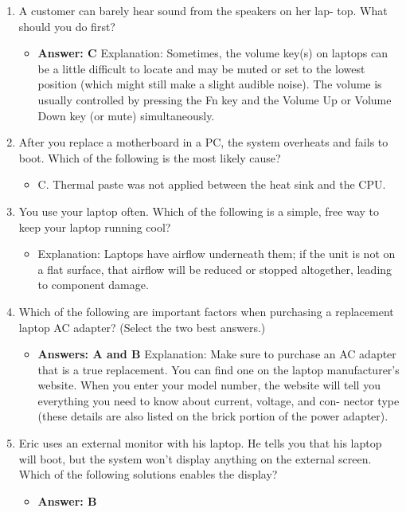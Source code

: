 \documentclass{article}
\begin{document}
\begin{enumerate}
    \item A customer can barely hear sound from the speakers on her lap-
top. What should you do first?
    \begin{itemize}
        \item \textbf{Answer: C}
Explanation: Sometimes, the volume key(s) on laptops can be a little difficult to locate
and may be muted or set to the lowest position (which might still make a slight audible
noise). The volume is usually controlled by pressing the Fn key and the Volume Up or
Volume Down key (or mute) simultaneously.
    \end{itemize}
    \item After you replace a motherboard in a PC, the system overheats and
fails to boot. Which of the following is the most likely cause?
    \begin{itemize}
        \item C. Thermal paste was not applied between the heat sink
and the CPU.
    \end{itemize}
    \item You use your laptop often. Which of the following is a simple, free
way to keep your laptop running cool?
    \begin{itemize}
        \item Explanation: Laptops have airflow underneath them; if the unit is not on a flat surface,
that airflow will be reduced or stopped altogether, leading to component damage.
    \end{itemize}
    \item Which of the following are important factors when purchasing a
replacement laptop AC adapter? (Select the two best answers.)
    \begin{itemize}
        \item \textbf{Answers: A and B}
Explanation: Make sure to purchase an AC adapter that is a true replacement. You can
find one on the laptop manufacturer’s website. When you enter your model number,
the website will tell you everything you need to know about current, voltage, and con-
nector type (these details are also listed on the brick portion of the power adapter).
    \end{itemize}
    \item Eric uses an external monitor with his laptop. He tells you that
his laptop will boot, but the system won’t display anything on
the external screen. Which of the following solutions enables the
display?
    \begin{itemize}
        \item \textbf{Answer: B}

\end{itemize}
\end{enumerate}
\end{document}
